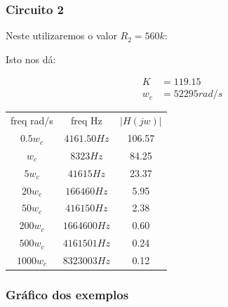 \documentclass[12pt,twoside, a4paper, twocolumn]{article}
\begin{document}
\subsubsection{Circuito 2}


Neste utilizaremos o valor  $R_2 = 560k$:


Isto nos dá:


\begin{equation}
    \begin{aligned}
        K   & = 119.15      \\
        w_c & = 52295 rad/s
    \end{aligned}
\end{equation}


\begin{center}
    \begin{tabular}{ |c|c|c| }
        \hline
        freq rad/s & freq Hz      & $\lvert H(jw) \rvert$ \\
        $0.5 w_c$  & $4161.50 Hz$ & 106.57                \\
        $w_c$      & $8323 Hz$    & 84.25                 \\
        $5 w_c$    & $41615 Hz$   & 23.37                 \\
        $20 w_c$   & $166460 Hz$  & 5.95                  \\
        $50 w_c$   & $416150 Hz$  & 2.38                  \\
        $200 w_c$  & $1664600 Hz$ & 0.60                  \\
        $500 w_c$  & $4161501 Hz$ & 0.24                  \\
        $1000 w_c$ & $8323003 Hz$ & 0.12                  \\
        \hline
    \end{tabular}
\end{center}


\newpage


\subsubsection{Gráfico dos exemplos}
\end{document}
